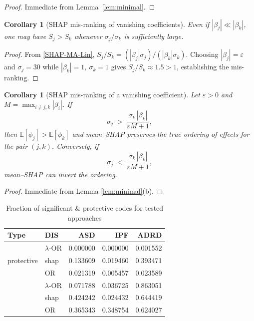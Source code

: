 \documentclass[pdflatex,sn-mathphys-num]{sn-jnl}%
\newcommand{\SPOR}{\textrm{$\lambda$-OR}}
\theoremstyle{thmstyleone}%
\newtheorem{corollary}[theorem]{Corollary} %
\theoremstyle{thmstyletwo}%
\theoremstyle{thmstylethree}%
\begin{document}
\begin{proof}
Immediate from Lemma~\ref{lem:minimal}.
\end{proof}

\begin{corollary}[SHAP mis-ranking of vanishing coefficients]
Even if $|\beta_j|\ll|\beta_k|$, one may have $S_j>S_k$ whenever
$\sigma_j/\sigma_k$ is sufficiently large.  
\end{corollary}

\begin{proof}
From \eqref{SHAP-MA-Lin}, $S_j/S_k=(|\beta_j|\sigma_j)/(|\beta_k|\sigma_k)$.  
Choosing $|\beta_j|=\varepsilon$ and $\sigma_j=30$ while $|\beta_k|=1,\ \sigma_k=1$
gives $S_j/S_k\approx1.5>1$, establishing the mis-ranking.
\end{proof}

\begin{corollary}[SHAP mis-ranking of a vanishing coefficient]\label{corshap2}
\label{cor:SHAPinflate}
Let $\varepsilon>0$ and $M=\max_{i\neq j,k}|\beta_i|$.  
If 
\[
\sigma_j \;>\; \frac{\sigma_k\,|\beta_k|}{\varepsilon M + 1},
\]
then $\mathbb{E}[\phi_j]>\mathbb{E}[\phi_k]$ and mean--SHAP preserves the true ordering of effects for the pair $(j,k)$.  
Conversely, if
\[
\sigma_j \;<\; \frac{\sigma_k\,|\beta_k|}{\varepsilon M + 1},
\]
mean--SHAP can invert the ordering.
\end{corollary}

\begin{proof}
Immediate from Lemma \ref{lem:minimal}(b).
\end{proof}


\begin{table}[t]
\centering
\caption{Fraction of significant \& protective codes for tested  approaches}\label{tabfrac}
\begin{tabular}{llrrr}
\toprule
Type & DIS & ASD & IPF & ADRD \\\hline
\midrule
\multirow{3}{*}{protective} 
  &  $\SPOR$ & 0.000000 & 0.000000 & 0.001552 \\
  & shap    & 0.133609 & 0.019460 & 0.393471 \\
  & OR      & 0.021319 & 0.005457 & 0.023589 \\
\addlinespace
\multirow{3}{*}{significant} 
  & $\SPOR$ & 0.071788 & 0.036725 & 0.863051 \\
  & shap    & 0.424242 & 0.024432 & 0.644419 \\
  & OR      & 0.365343 & 0.348754 & 0.624027 \\
\bottomrule
\end{tabular}
\end{table}
\end{document}
